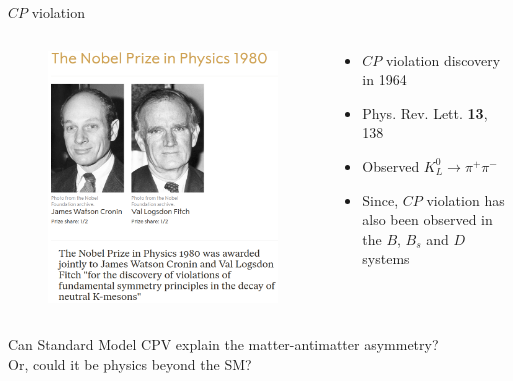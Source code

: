 \documentclass{beamer}
\begin{document}
\begin{frame}{$C\!P$ violation}
  \begin{columns}
    \begin{column}{0.4\textwidth}
      \begin{figure}
        \includegraphics[width=1.0\textwidth]{Plots/NobelPrize1980.png}
      \end{figure}
    \end{column}
    \begin{column}{0.6\textwidth}
      \begin{itemize}
        \setlength\itemsep{1.0em}
        \item{$C\!P$ violation discovery in 1964}
        \item{Phys. Rev. Lett. \textbf{13}, 138}
        \item{Observed $K_L^0\to\pi^+\pi^-$}
        \item{Since, $C\!P$ violation has also been observed in the $B$, $B_s$ and $D$ systems}
      \end{itemize}
    \end{column}
  \end{columns}
  \vspace{0.5cm}
  \begin{center}
    \large Can Standard Model CPV explain the matter-antimatter asymmetry?\\Or, could it be physics beyond the SM?
  \end{center}
\end{frame}
\end{document}

